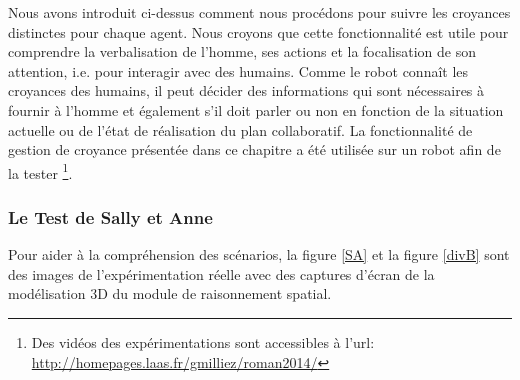 \documentclass[a4paper,11pt,twoside]{StyleThese}
\begin{document}
Nous avons introduit ci-dessus comment nous procédons pour suivre les croyances distinctes pour chaque agent. Nous croyons que cette fonctionnalité est utile pour comprendre la verbalisation de l'homme, ses actions et la focalisation de son attention, i.e. pour interagir avec des humains. Comme le robot connaît les croyances des humains, il peut décider des informations qui sont nécessaires à fournir à l'homme et également s'il doit parler ou non en fonction de la situation actuelle ou de l'état de réalisation du plan collaboratif. La fonctionnalité de gestion de croyance présentée dans ce chapitre a été utilisée sur un robot afin de la tester \footnote{Des vidéos des expérimentations sont accessibles à l'url: \url{http://homepages.laas.fr/gmilliez/roman2014/}}.




\subsubsection{Le Test de Sally et Anne}

Pour aider à la compréhension des scénarios, la figure \ref{SA} et la figure  \ref{divB} sont des images de l'expérimentation réelle avec des captures d'écran de la modélisation 3D du module de raisonnement spatial.


\begin{figure}[ht!]
  \begin{center}
  \end{center}
\end{figure}
    
\end{document}
